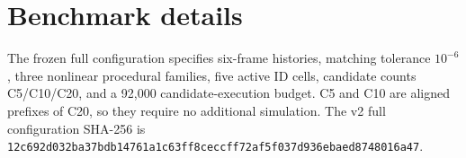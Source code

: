 \section{Benchmark details}
The frozen full configuration specifies six-frame histories, matching tolerance $10^{-6}$, three nonlinear procedural families, five active ID cells, candidate counts C5/C10/C20, and a 92,000 candidate-execution budget. C5 and C10 are aligned prefixes of C20, so they require no additional simulation. The v2 full configuration SHA-256 is \texttt{12c692d032ba37bdb14761a1c63ff8ceccff72af5f037d936ebaed8748016a47}.
